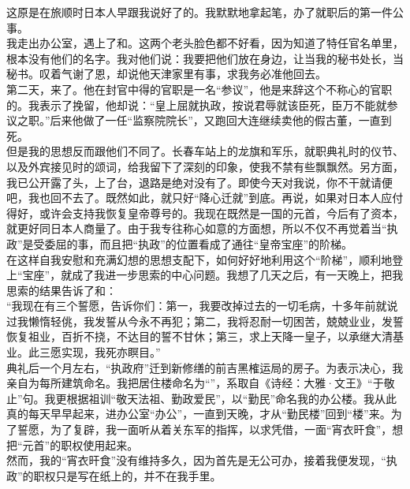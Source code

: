 这原是在旅顺时日本人早跟我说好了的。我默默地拿起笔，办了就职后的第一件公事。\\

我走出办公室，遇上了和。这两个老头脸色都不好看，因为知道了特任官名单里，根本没有他们的名字。我对他们说：我要把他们放在身边，让当我的秘书处长，当秘书。叹着气谢了恩，却说他天津家里有事，求我务必准他回去。\\

第二天，来了。他在封官中得的官职是一名“参议”，他是来辞这个不称心的官职的。我表示了挽留，他却说：“皇上屈就执政，按说君辱就该臣死，臣万不能就参议之职。”后来他做了一任“监察院院长”，又跑回大连继续卖他的假古董，一直到死。\\

但是我的思想反而跟他们不同了。长春车站上的龙旗和军乐，就职典礼时的仪节、以及外宾接见时的颂词，给我留下了深刻的印象，使我不禁有些飘飘然。另方面，我已公开露了头，上了台，退路是绝对没有了。即使今天对我说，你不干就请便吧，我也回不去了。既然如此，就只好“降心迁就”到底。再说，如果对日本人应付得好，或许会支持我恢复皇帝尊号的。我现在既然是一国的元首，今后有了资本，就更好同日本人商量了。由于我专往称心如意的方面想，所以不仅不再觉着当“执政”是受委屈的事，而且把“执政”的位置看成了通往“皇帝宝座”的阶梯。\\

在这样自我安慰和充满幻想的思想支配下，如何好好地利用这个“阶梯”，顺利地登上“宝座”，就成了我进一步思索的中心问题。我想了几天之后，有一天晚上，把我思索的结果告诉了和：\\

“我现在有三个誓愿，告诉你们：第一，我要改掉过去的一切毛病，十多年前就说过我懒惰轻佻，我发誓从今永不再犯；第二，我将忍耐一切困苦，兢兢业业，发誓恢复祖业，百折不挠，不达目的誓不甘休；第三，求上天降一皇子，以承继大清基业。此三愿实现，我死亦瞑目。”\\

典礼后一个月左右，“执政府”迁到新修缮的前吉黑榷运局的房子。为表示决心，我亲自为每所建筑命名。我把居住楼命名为“”，系取自《诗经：大雅·文王》“于敬止”句。我更根据祖训“敬天法祖、勤政爱民”，以“勤民”命名我的办公楼。我从此真的每天早早起来，进办公室“办公”，一直到天晚，才从“勤民楼”回到“楼”来。为了誓愿，为了复辟，我一面听从着关东军的指挥，以求凭借，一面“宵衣旰食”，想把“元首”的职权使用起来。\\

然而，我的“宵衣旰食”没有维持多久，因为首先是无公可办，接着我便发现，“执政”的职权只是写在纸上的，并不在我手里。
